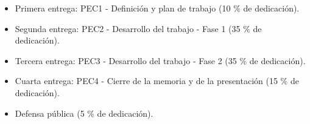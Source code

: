 \documentclass[IB,BIB]{TFUOC}%
\begin{document}
% 
% 
% 

{\small
\begin{itemize}
    \item Primera entrega: PEC1 - Definición y plan de trabajo (10 \% de dedicación).
    \item Segunda entrega: PEC2 - Desarrollo del trabajo - Fase 1 (35 \% de dedicación).
    \item Tercera entrega: PEC3 - Desarrollo del trabajo - Fase 2 (35 \% de dedicación).
    \item Cuarta entrega: PEC4 - Cierre de la memoria y de la presentación (15 \% de dedicación).
    \item Defensa pública (5 \% de dedicación).
\end{itemize}}
\end{document}
